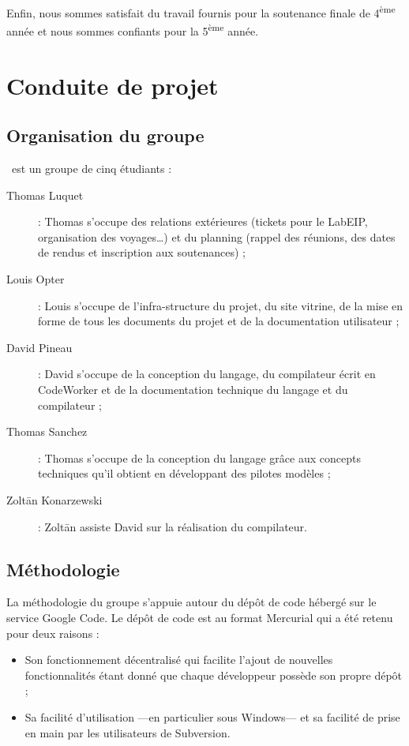 \documentclass[francais]{rtxreport}
\begin{document}
Enfin, nous sommes satisfait du travail fournis pour la soutenance finale de
4\textsuperscript{ème} année et nous sommes confiants pour la
5\textsuperscript{ème} année.

\chapter{Conduite de projet}

\section{Organisation du groupe}

\rtx\ est un groupe de cinq étudiants :
\begin{description}
\item[Thomas Luquet] : Thomas s'occupe des relations extérieures (tickets pour
  le LabEIP, organisation des voyages\ldots) et du planning (rappel des
  réunions, des dates de rendus et inscription aux soutenances) ;
\item[Louis Opter] : Louis s'occupe de l'infra-structure du projet, du site
  vitrine, de la mise en forme de tous les documents du projet et de la
  documentation utilisateur ;
\item[David Pineau] : David s'occupe de la conception du langage, du compilateur
  écrit en CodeWorker et de la documentation technique du langage et du
  compilateur ;
\item[Thomas Sanchez] : Thomas s'occupe de la conception du langage grâce aux
  concepts techniques qu'il obtient en développant des pilotes modèles ;
\item[Zolt\={a}n Konarzewski] : Zolt\={a}n assiste David sur la réalisation du
  compilateur.
\end{description}


\section{Méthodologie}

La méthodologie du groupe s'appuie autour du dépôt de code hébergé sur le
service Google Code. Le dépôt de code est au format Mercurial qui a été retenu
pour deux raisons :
\begin{itemize}
\item Son fonctionnement décentralisé qui facilite l'ajout de nouvelles
  fonctionnalités étant donné que chaque développeur possède son propre dépôt ;
\item Sa facilité d'utilisation ---en particulier sous Windows--- et sa facilité
  de prise en main par les utilisateurs de Subversion.
\end{itemize}
\end{document}
